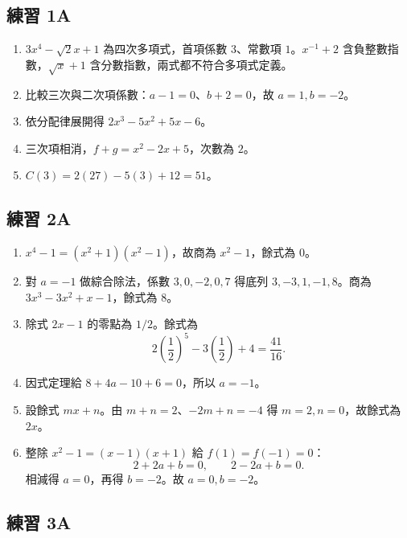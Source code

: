 \documentclass[11pt,a4paper]{article}
\providecommand{\tightlist}{%
  \setlength{\itemsep}{0pt}\setlength{\parskip}{0pt}}
\begin{document}
\subsection{練習 1A}\label{ux7df4ux7fd2-1a-1}

\begin{enumerate}
\def\labelenumi{\arabic{enumi}.}
\tightlist
\item
  \(3x^4-\sqrt2x+1\) 為四次多項式，首項係數 \(3\)、常數項 \(1\)。\(x^{-1}+2\) 含負整數指數，\(\sqrt{x}+1\) 含分數指數，兩式都不符合多項式定義。
\item
  比較三次與二次項係數：\(a-1=0\)、\(b+2=0\)，故 \(\boxed{a=1,b=-2}\)。
\item
  依分配律展開得 \(\boxed{2x^3-5x^2+5x-6}\)。
\item
  三次項相消，\(f+g=\boxed{x^2-2x+5}\)，次數為 \(2\)。
\item
  \(C(3)=2(27)-5(3)+12=\boxed{51}\)。
\end{enumerate}

\subsection{練習 2A}\label{ux7df4ux7fd2-2a-1}

\begin{enumerate}
\def\labelenumi{\arabic{enumi}.}
\tightlist
\item
  \(x^4-1=(x^2+1)(x^2-1)\)，故商為 \(\boxed{x^2-1}\)，餘式為 \(0\)。
\item
  對 \(a=-1\) 做綜合除法，係數 \(3,0,-2,0,7\) 得底列 \(3,-3,1,-1,8\)。商為 \(\boxed{3x^3-3x^2+x-1}\)，餘式為 \(\boxed8\)。
\item
  除式 \(2x-1\) 的零點為 \(1/2\)。餘式為
  \[2\left(\frac12\right)^5-3\left(\frac12\right)+4=\boxed{\frac{41}{16}}.\]
\item
  因式定理給 \(8+4a-10+6=0\)，所以 \(\boxed{a=-1}\)。
\item
  設餘式 \(mx+n\)。由 \(m+n=2\)、\(-2m+n=-4\) 得 \(m=2,n=0\)，故餘式為 \(\boxed{2x}\)。
\item
  整除 \(x^2-1=(x-1)(x+1)\) 給 \(f(1)=f(-1)=0\)：
  \[2+2a+b=0,\qquad2-2a+b=0.\]
  相減得 \(a=0\)，再得 \(b=-2\)。故 \(\boxed{a=0,b=-2}\)。
\end{enumerate}

\subsection{練習 3A}\label{ux7df4ux7fd2-3a-1}
\end{document}
